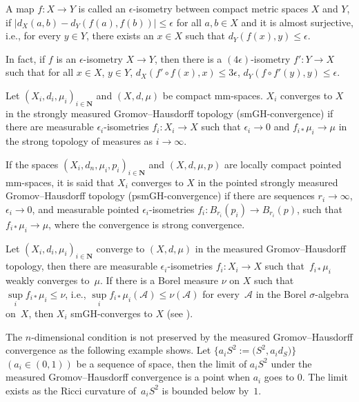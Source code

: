 \documentclass[10pt,a4paper]{amsart}
\begin{document}
 A map $f\colon X\rightarrow Y$ is called an $\epsilon$-isometry between compact metric spaces $X$ and $Y$, if $|d_{X}(a, b)-d_{Y}(f(a), f(b))|\leq\epsilon$ for all $a,b \in X$ and it is almost surjective, i.e., for every $y\in Y$, there exists an $x\in X$ such that $d_Y(f(x), y)\leq \epsilon$.

 In fact, if $f$ is an $\epsilon$-isometry $X\rightarrow Y$, then there is a $(4\epsilon)$-isometry $f'\colon Y\rightarrow X$ such that for all $x\in X$, $y\in Y$, $d_X(f'\circ f(x), x)\leq 3\epsilon$, $d_Y(f\circ f'(y), y)\leq \epsilon$.

 \begin{Definition}
 Let $(X_i, d_i, \mu_i)_{i\in\mathbf{N}}$ and $(X, d, \mu)$ be compact mm-spaces. $X_i$ converges to $X$ in the strongly measured Gromov--Hausdorff topology (smGH-convergence) if there are measurable $\epsilon_i$-isometries $f_i\colon X_i\rightarrow X$ such that $ \epsilon_i \rightarrow 0$ and $f_{i*}\mu_i\rightarrow \mu$ in the strong topology of measures as $i\rightarrow \infty$.

 If the spaces $(X_i,d_n,\mu_i,p_i)_{i\in\mathbf{N}}$ and $(X,d,\mu,p)$ are locally compact pointed mm-spaces, it is said that $X_i$ converges to $X$ in the pointed strongly measured Gromov--Hausdorff topo\-lo\-gy (psmGH-convergence) if there are sequences $r_i\to \infty$, $\epsilon_i \to 0$, and measurable pointed $\epsilon_i$-isometries $f_i\colon B_{r_i}(p_i)\to B_{r_i}(p)$, such that $f_{i*}\mu_i \to \mu$, where the convergence is strong convergence.
 \end{Definition}

\begin{Remark}Let $(X_i, d_i, \mu_i)_{i\in\mathbf{N}}$ converge to $(X, d, \mu)$ in the measured Gromov--Hausdorff topo\-lo\-gy, then there are measurable $\epsilon_i$-isometries $f_i\colon X_i\rightarrow X$ such that~$f_{i*}\mu_i$ weakly converges to~$\mu$. If there is a Borel measure $\nu$ on $X$ such that $\sup\limits_{i}f_{i*}\mu_i\leq \nu$, i.e., $\sup \limits_{i}f_{i*}\mu_i (\mathcal{A})\leq \nu(\mathcal{A})$ for every~$\mathcal{A}$ in the Borel $\sigma$-algebra on~$X$, then $X_i$ smGH-converges to $X$ (see \cite[Lemma~4.1]{MR1453465}).
\end{Remark}

\begin{Remark}The $n$-dimensional condition is not preserved by the measured Gromov--Hausdorff convergence as the following example shows. Let $\big\{a_i S^2:= \big(S^2, a_i d_S \big)\big\}$ $(a_i \in (0,1))$ be a sequence of space, then the limit of $a_i S^2$ under the measured Gromov--Hausdorff convergence is a point when $a_i$ goes to $0$. The limit exists as the Ricci curvature of~$a_i S^2$ is bounded below by~$1$.
\end{Remark}
\end{document}

